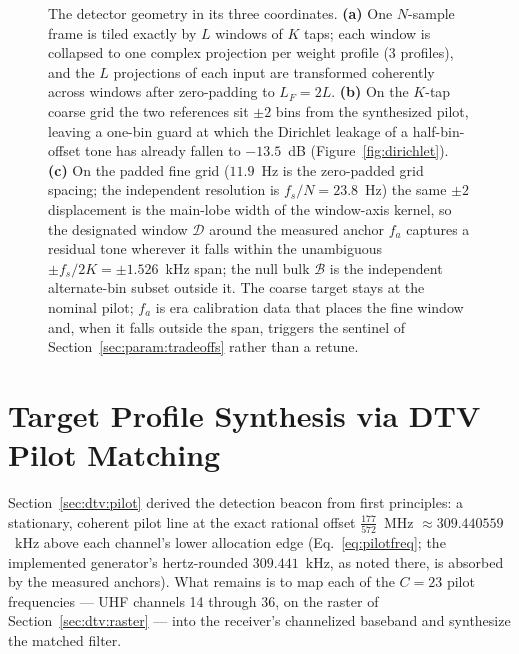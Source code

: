 \begin{figure}[t]
{}
\caption[Detector geometry in its three coordinates]{The detector geometry in its three coordinates. \textbf{(a)} One $N$-sample frame is tiled exactly by $L$ windows of $K$ taps; each window is collapsed to one complex projection per weight profile ($3$ profiles), and the $L$ projections of each input are transformed coherently across windows after zero-padding to $L_F = 2L$. \textbf{(b)} On the $K$-tap coarse grid the two references sit $\pm 2$ bins from the synthesized pilot, leaving a one-bin guard at which the Dirichlet leakage of a half-bin-offset tone has already fallen to $-13.5$~dB (Figure~\ref{fig:dirichlet}). \textbf{(c)} On the padded fine grid ($11.9$~Hz is the zero-padded grid spacing; the independent resolution is $f_s/N = 23.8$~Hz) the same $\pm 2$ displacement is the main-lobe width of the window-axis kernel, so the designated window $\mathcal{D}$ around the measured anchor $f_a$ captures a residual tone wherever it falls within the unambiguous $\pm f_s/2K = \pm 1.526$~kHz span; the null bulk $\mathcal{B}$ is the independent alternate-bin subset outside it. The coarse target stays at the nominal pilot; $f_a$ is era calibration data that places the fine window and, when it falls outside the span, triggers the sentinel of Section~\ref{sec:param:tradeoffs} rather than a retune.}
\label{fig:param:geometry}
\end{figure}

\section{Target Profile Synthesis via DTV Pilot Matching}
\label{sec:param:target}

Section~\ref{sec:dtv:pilot} derived the detection beacon from first principles: a stationary, coherent pilot line at the exact rational offset $\tfrac{177}{572}$~MHz $\approx 309.440559$~kHz above each channel's lower allocation edge (Eq.~\eqref{eq:pilotfreq}; the implemented generator's hertz-rounded $309.441$~kHz, as noted there, is absorbed by the measured anchors). What remains is to map each of the $C = 23$ pilot frequencies --- UHF channels 14 through 36, on the raster of Section~\ref{sec:dtv:raster} --- into the receiver's channelized baseband and synthesize the matched filter.

